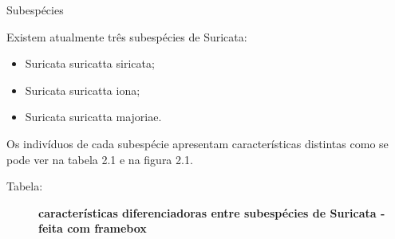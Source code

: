 \documentclass[11pt]{beamer}
\begin{document}
\begin{frame} {Subespécies}

Existem atualmente três subespécies de Suricata:
\begin{itemize}
\item Suricata suricatta siricata;
\item Suricata suricatta iona;
\item Suricata suricatta majoriae.
\end{itemize}
Os indivíduos de cada subespécie apresentam características distintas
como se pode ver na tabela 2.1 e na figura 2.1.
\vspace{5mm}

\begin{description}
\item[Tabela:]\textbf{características diferenciadoras entre subespécies de Suricata - feita com framebox}
\end{description}


\begin{table}[]
\end{table}
\end{frame}
\end{document}

